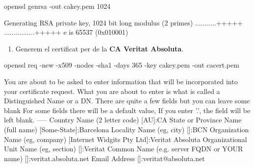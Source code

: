 \documentclass[]{article}
\newenvironment{Shaded}{}{}
\newcommand{\ExtensionTok}[1]{#1}
\newcommand{\NormalTok}[1]{#1}
\newcommand{\StringTok}[1]{\textcolor[rgb]{0.25,0.44,0.63}{#1}}
\providecommand{\tightlist}{%
  \setlength{\itemsep}{0pt}\setlength{\parskip}{0pt}}
\begin{document}
\begin{Shaded}
\begin{Highlighting}[]
\ExtensionTok{openssl}\NormalTok{ genrsa -out cakey.pem 1024}
\end{Highlighting}
\end{Shaded}

\begin{Shaded}
\begin{Highlighting}[]
\ExtensionTok{Generating}\NormalTok{ RSA private key, 1024 bit long modulus (2 primes)}
\ExtensionTok{...........+++++}
\ExtensionTok{................+++++}
\ExtensionTok{e}\NormalTok{ is 65537 (0x010001)}
\end{Highlighting}
\end{Shaded}

\begin{enumerate}
\def\labelenumi{\arabic{enumi}.}
\setcounter{enumi}{1}
\tightlist
\item
  Generem el certificat per de la \textbf{CA Veritat Absoluta}.
\end{enumerate}

\begin{Shaded}
\begin{Highlighting}[]
\ExtensionTok{openssl}\NormalTok{ req -new -x509 -nodes -sha1 -days 365 -key cakey.pem -out cacert.pem}
\end{Highlighting}
\end{Shaded}

\begin{Shaded}
\begin{Highlighting}[]
\ExtensionTok{You}\NormalTok{ are about to be asked to enter information that will be incorporated}
\ExtensionTok{into}\NormalTok{ your certificate request.}
\ExtensionTok{What}\NormalTok{ you are about to enter is what is called a Distinguished Name or a DN.}
\ExtensionTok{There}\NormalTok{ are quite a few fields but you can leave some blank}
\ExtensionTok{For}\NormalTok{ some fields there will be a default value,}
\ExtensionTok{If}\NormalTok{ you enter }\StringTok{'.'}\NormalTok{, the field will be left blank.}
\ExtensionTok{-----}
\ExtensionTok{Country}\NormalTok{ Name (2 letter code) [}\ExtensionTok{AU}\NormalTok{]:CA}
\ExtensionTok{State}\NormalTok{ or Province Name (full name) [}\ExtensionTok{Some-State}\NormalTok{]:Barcelona}
\ExtensionTok{Locality}\NormalTok{ Name (eg, city) []:}\ExtensionTok{BCN}
\ExtensionTok{Organization}\NormalTok{ Name (eg, company) [}\ExtensionTok{Internet}\NormalTok{ Widgits Pty Ltd]:Veritat Absoluta}
\ExtensionTok{Organizational}\NormalTok{ Unit Name (eg, section) []:}\ExtensionTok{Veritat}
\ExtensionTok{Common}\NormalTok{ Name (e.g. server FQDN or YOUR name) []:}\ExtensionTok{veritat.absoluta.net}
\ExtensionTok{Email}\NormalTok{ Address []:veritat@absoluta.net}
\end{Highlighting}
\end{Shaded}
\end{document}
